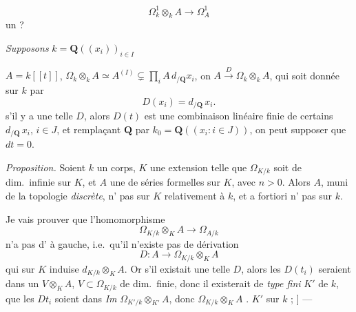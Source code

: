 \documentclass[11pt,a4paper]{article}
\begin{document}
\[
  \Omega^{1}_{k} \otimes_{k} A \longrightarrow \Omega^{1}_{A}
\]
 un  ?

\emph{Supposons}  \quad
$k = \mathbf{Q}((x_i))_{i \in I}$ \quad {}

$A = k[[t]]$, \quad
$\Omega_{k} \otimes_{k} A \simeq A^{(I)} \subsetneq \prod_{i} A\, d_{/\mathbf{Q}} x_i$,
on 
$A \xrightarrow{\;D\;} \Omega_{k} \otimes_{k} A$, qui soit
donnée sur $k$ par
\[
  D(x_i) = d_{/\mathbf{Q}}\, x_i .
\]
 s'il y a une telle $D$, alors $D(t)$ est une combinaison
linéaire finie de certains $d_{/\mathbf{Q}}\, x_i$, $i \in J$, et remplaçant
$\mathbf{Q}$ par $k_0 = \mathbf{Q}((x_i : i \in J))$, on peut supposer que
$dt = 0$. 

\emph{Proposition.} Soient $k$ un corps, $K$ une extension telle que
$\Omega_{K/k}$ soit de dim.\ infinie sur $K$, et
$A$  une  de séries formelles
sur $K$, avec $n > 0$. Alors $A$, muni de la topologie \emph{discrète},
n' pas  sur $K$ relativement à $k$, et
a fortiori n' pas  sur $k$.

Je vais prouver que l'homomorphisme
\[
  \Omega_{K/k} \otimes_{K} A \longrightarrow \Omega_{A/k}
\]
n'a pas d' à gauche, i.e.\ qu'il n'existe pas de
dérivation
\[
  D : A \longrightarrow \Omega_{K/k} \otimes_{K} A
\]
qui sur $K$ induise $d_{K/k} \otimes_{K} A$.  Or s'il existait
une telle $D$, alors les $D(t_i)$ seraient dans un 
$V \otimes_{K} A$, $V \subset \Omega_{K/k}$ de dim.\ finie, donc il
existerait  de \emph{type fini} $K'$ de $k$, 
que les $D t_i$ soient dans \emph{Im}
$\Omega_{K'/k} \otimes_{K'} A$, donc \ill{} \struck{\ill{}}
$\Omega_{K/k} \otimes_{K} A$ \ill{} \ill{}. 
\ill{} \ill{} $K'$ sur $k$ ;   ] — \ill{} \ill{}
\end{document}
